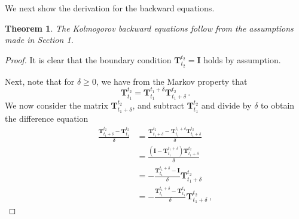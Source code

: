 \documentclass[10pt]{article}
\newtheorem{theorem}{Theorem}[section]
\begin{document}
We next show the derivation for the backward equations.
\begin{theorem}
The Kolmogorov backward equations follow from the assumptions made in Section 1.
\end{theorem}
\begin{proof}
It is clear that the boundary condition $\mathbf{T}_{t_2}^{t_2}=\mathbf{I}$ holds by assumption.

Next, note that for $\delta\geq 0$, we have from the Markov property that
\begin{equation*}
\mathbf{T}_{t_1}^{t_2} = \mathbf{T}_{t_1}^{t_1+\delta}\mathbf{T}_{t_1+\delta}^{t_2}\,.
\end{equation*}
We now consider the matrix $\mathbf{T}_{t_1+\delta}^{t_2}$, and subtract $\mathbf{T}_{t_1}^{t_2}$ and divide by $\delta$ to obtain the difference equation
\begin{align*}
\frac{\mathbf{T}_{t_1+\delta}^{t_2} - \mathbf{T}_{t_1}^{t_2}}{\delta} &= \frac{\mathbf{T}_{t_1+\delta}^{t_2} - \mathbf{T}_{t_1}^{t_1+\delta}\mathbf{T}_{t_1+\delta}^{t_2}}{\delta}\\
 &= \frac{\left(\mathbf{I} - \mathbf{T}_{t_1}^{t_1+\delta}\right)\mathbf{T}_{t_1+\delta}^{t_2}}{\delta} \\
 &= -\frac{\mathbf{T}_{t_1}^{t_1+\delta} - \mathbf{I}}{\delta}\mathbf{T}_{t_1+\delta}^{t_2} \\
 &= -\frac{\mathbf{T}_{t_1}^{t_1+\delta} - \mathbf{T}_{t_1}^{t_1}}{\delta}\mathbf{T}_{t_1+\delta}^{t_2}\,,

\end{align*}
\end{proof}
\end{document}

